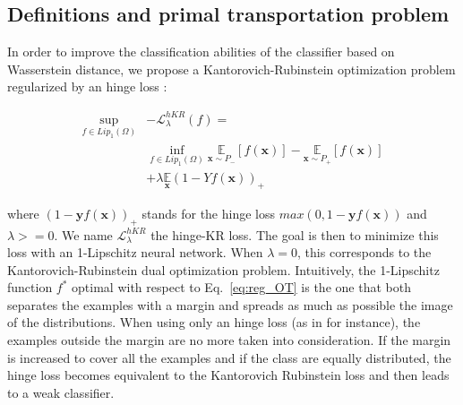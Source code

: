 \subsection{Definitions and primal transportation problem}
In order to improve the classification abilities of the classifier based on Wasserstein distance, we propose a Kantorovich-Rubinstein optimization problem regularized by an hinge loss :


\begin{equation} \label{eq:reg_OT} 
\begin{split} 
\sup_{f \in Lip_1(\Omega)}&-\mathcal{L}^{hKR}_\lambda(f) =\\ & \inf_{f \in Lip_1(\Omega)} \underset{\textbf{x} \sim P_-}{\mathbb{E}} \left[f(\textbf{x})\right]-\underset{\textbf{x} \sim P_+}{\mathbb{E}}\left[f(\textbf{x})\right] \\ &+\lambda\underset{\textbf{x}}{\mathbb{E}} \left(1-Yf(\textbf{x})\right)_+ \end{split} 
\end{equation}

where $(1-\textbf{y}f(\textbf{x}))_+$ stands for the hinge loss $max(0,1-\textbf{y}f(\textbf{x}))$ and $\lambda>=0$. We name $\mathcal{L}^{hKR}_\lambda$ the hinge-KR loss. The goal is then to minimize this loss with an 1-Lipschitz neural network.
When $\lambda=0$, this corresponds to the Kantorovich-Rubinstein dual optimization problem. Intuitively, the 1-Lipschitz function $f^*$ optimal with respect to Eq.~\eqref{eq:reg_OT} is the one that both separates the examples with a margin and spreads as much as possible the image of the distributions. When using only an hinge loss (as in \cite{li2019preventing} for instance), the examples outside the margin are no more taken into consideration. If the margin is increased to cover all the examples and if the class are equally distributed, the hinge loss becomes equivalent to the Kantorovich Rubinstein loss and then leads to a weak classifier. 

